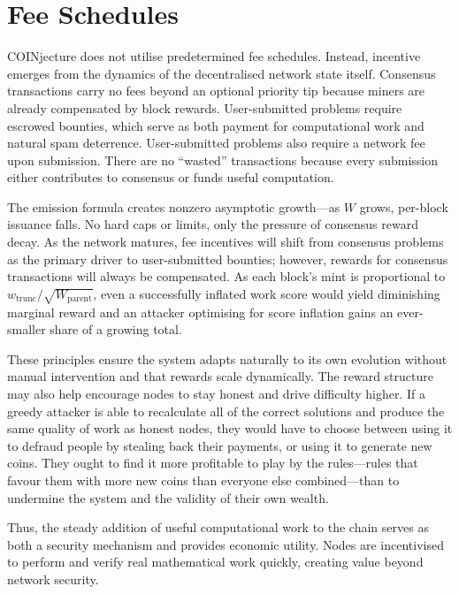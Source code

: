 \documentclass[12pt,letterpaper]{article}
\begin{document}
\section*{Fee Schedules}

COINjecture does not utilise predetermined fee schedules. Instead, incentive emerges from the dynamics
of the decentralised network state itself. Consensus transactions carry no fees beyond an optional priority
tip because miners are already compensated by block rewards. User-submitted problems require escrowed
bounties, which serve as both payment for computational work and natural spam deterrence.
User-submitted problems also require a network fee upon submission. There are no ``wasted''
transactions because every submission either contributes to consensus or funds useful computation.

The emission formula creates nonzero asymptotic growth---as $W$ grows, per-block issuance falls. No
hard caps or limits, only the pressure of consensus reward decay. As the network matures, fee incentives
will shift from consensus problems as the primary driver to user-submitted bounties; however, rewards
for consensus transactions will always be compensated. As each block's mint is proportional to
$w_{\mathrm{trunc}} / \sqrt{W_{\mathrm{parent}}}$, even a successfully inflated work score would yield
diminishing marginal reward and an attacker optimising for score inflation gains an ever-smaller share of
a growing total.

These principles ensure the system adapts naturally to its own evolution without manual intervention and
that rewards scale dynamically. The reward structure may also help encourage nodes to stay honest and
drive difficulty higher. If a greedy attacker is able to recalculate all of the correct solutions and produce
the same quality of work as honest nodes, they would have to choose between using it to defraud people
by stealing back their payments, or using it to generate new coins. They ought to find it more profitable
to play by the rules---rules that favour them with more new coins than everyone else combined---than to
undermine the system and the validity of their own wealth.

Thus, the steady addition of useful computational work to the chain serves as both a security mechanism
and provides economic utility. Nodes are incentivised to perform and verify real mathematical work
quickly, creating value beyond network security.
\end{document}
